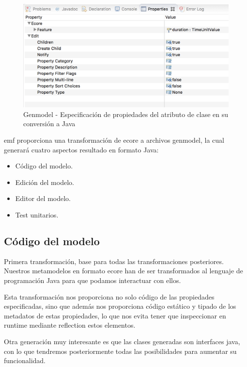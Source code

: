 \begin{figure}[p]
	\centering
    \includegraphics[scale=0.4]{images/emf_capturas/genmodel_atributo}
    \sourcepropia{}
    \caption{Genmodel - Especificación de propiedades del atributo de clase en su conversión a Java}
    \label{fig:modelo_genmodel_atributo}
\end{figure}


\gls{emf} proporciona una transformación de \gls{ecore} a archivos genmodel, la cual generará cuatro aspectos resultado en formato Java:

\begin{itemize}
    \item Código del modelo.
    \item Edición del modelo.
    \item Editor del modelo.
    \item Test unitarios.
\end{itemize}

\subsection{Código del modelo}

Primera transformación, base para todas las transformaciones posteriores. Nuestros metamodelos en formato \gls{ecore} han de ser transformados al lenguaje de programación Java para que podamos interactuar con ellos.

Esta transformación nos proporciona no solo código de las propiedades especificadas, sino que además nos proporciona código estático y tipado de los \gls{metadatos} de estas propiedades, lo que nos evita tener que inspeccionar en \gls{runtime} mediante \gls{reflection} estos elementos.

Otra generación muy interesante es que las clases generadas son interfaces java, con lo que tendremos posteriormente todas las posibilidades para aumentar su funcionalidad.

